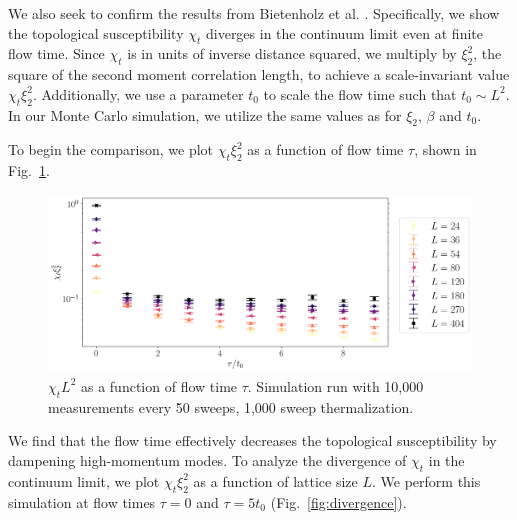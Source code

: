 We also seek to confirm the results from Bietenholz et al. \cite{bietenholz2018}. Specifically, we show the topological susceptibility $\chi_t$ diverges in the continuum limit even at finite flow time. Since $\chi_t$ is in units of inverse distance squared, we multiply by $\xi_2^2$, the square of the second moment correlation length, to achieve a scale-invariant value $\chi_t\xi_2^2$. Additionally, we use a parameter $t_0$ to scale the flow time such that $t_0\sim L^2$. In our Monte Carlo simulation, we utilize the same values as \cite{bietenholz2018} for $\xi_2$, $\beta$ and $t_0$.

To begin the comparison, we plot $\chi_t\xi_2^2$ as a function of flow time $\tau$, shown in Fig.~\ref{fig:bietenholz}.
\begin{figure}[h!]
    \centering
      \includegraphics[width=\textwidth]{imgs/bietenholz.png}
      \caption{\label{fig:bietenholz} $\chi_t L^2$ as a  function of flow time $\tau$. Simulation run with 10,000 measurements every 50 sweeps, 1,000 sweep thermalization.}
\end{figure}
We find that the flow time effectively decreases the topological susceptibility by dampening high-momentum modes. To analyze the divergence of $\chi_t$ in the continuum limit, we plot $\chi_t \xi_2^2$ as a function of lattice size $L$. We perform this simulation at flow times $\tau=0$ and $\tau=5t_0$ (Fig.~\ref{fig:divergence}).
